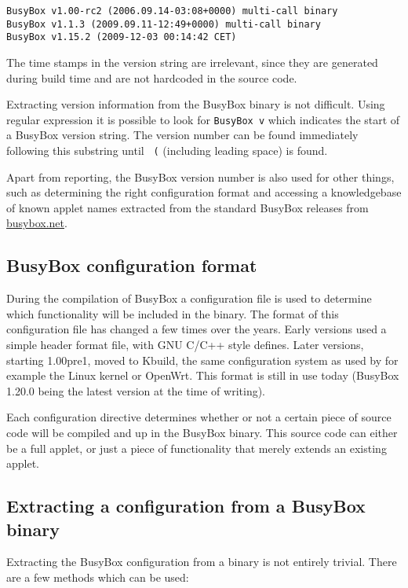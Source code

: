 \documentclass[10pt,a4paper]{article}
\begin{document}
\begin{verbatim}
BusyBox v1.00-rc2 (2006.09.14-03:08+0000) multi-call binary
BusyBox v1.1.3 (2009.09.11-12:49+0000) multi-call binary
BusyBox v1.15.2 (2009-12-03 00:14:42 CET)
\end{verbatim}

The time stamps in the version string are irrelevant, since they are generated
during build time and are not hardcoded in the source code.

Extracting version information from the BusyBox binary is not difficult.
Using regular expression it is possible to look for \texttt{BusyBox v} which
indicates the start of a BusyBox version string. The version number can be
found immediately following this substring until \texttt{ (} (including
leading space) is found.

Apart from reporting, the BusyBox version number is also used for other
things, such as determining the right configuration format and accessing a
knowledgebase of known applet names extracted from the standard BusyBox
releases from \url{busybox.net}.

\subsection{BusyBox configuration format}

During the compilation of BusyBox a configuration file is used to determine
which functionality will be included in the binary. The format of this
configuration file has changed a few times over the years. Early versions used
a simple header format file, with GNU C/C++ style defines. Later versions,
starting 1.00pre1, moved to Kbuild, the same configuration system as used by
for example the Linux kernel or OpenWrt. This format is still in use today
(BusyBox 1.20.0 being the latest version at the time of writing).

Each configuration directive determines whether or not a certain piece of
source code will be compiled and up in the BusyBox binary. This source code can
either be a full applet, or just a piece of functionality that merely extends
an existing applet.

\subsection{Extracting a configuration from a BusyBox binary}

Extracting the BusyBox configuration from a binary is not entirely trivial.
There are a few methods which can be used:
\end{document}

